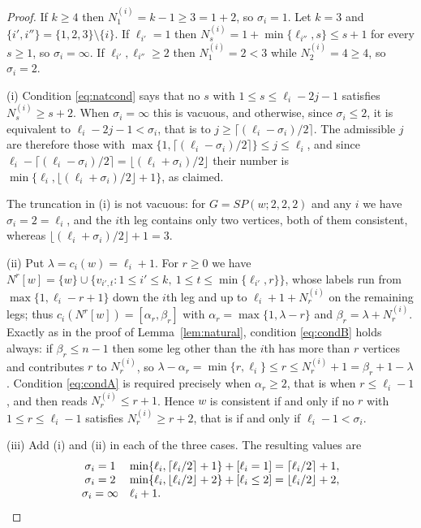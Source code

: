 \documentclass[reqno,10pt]{article}
\theoremstyle{definition}
\numberwithin{equation}{section}
\numberwithin{theorem}{section}
\newcommand{\Ball}[2]{N^{#2}[#1]}
\begin{document}
\begin{proof}
If $k\ge4$ then $N^{(i)}_1=k-1\ge3=1+2$, so $\sigma_i=1$. Let $k=3$ and
$\{i',i''\}=\{1,2,3\}\setminus\{i\}$. If $\ell_{i'}=1$ then
$N^{(i)}_s=1+\min\{\ell_{i''},s\}\le s+1$ for every $s\ge1$, so
$\sigma_i=\infty$. If $\ell_{i'},\ell_{i''}\ge2$ then $N^{(i)}_1=2<3$ while
$N^{(i)}_2=4\ge4$, so $\sigma_i=2$.

\smallskip
\noindent(i) Condition \eqref{eq:natcond} says that no $s$ with
$1\le s\le \ell_i-2j-1$ satisfies $N^{(i)}_s\ge s+2$. When $\sigma_i=\infty$
this is vacuous, and otherwise, since $\sigma_i\le2$, it is equivalent to
$\ell_i-2j-1<\sigma_i$, that is to $j\ge\lceil(\ell_i-\sigma_i)/2\rceil$. The
admissible $j$ are therefore those with
$\max\{1,\lceil(\ell_i-\sigma_i)/2\rceil\}\le j\le\ell_i$, and since
$\ell_i-\lceil(\ell_i-\sigma_i)/2\rceil=\lfloor(\ell_i+\sigma_i)/2\rfloor$ their
number is $\min\{\ell_i,\lfloor(\ell_i+\sigma_i)/2\rfloor+1\}$, as claimed.

\smallskip
\noindent The truncation in (i) is not vacuous: for $G=SP(w;2,2,2)$ and any $i$
we have $\sigma_i=2=\ell_i$, and the $i$th leg contains only two vertices, both
of them consistent, whereas $\lfloor(\ell_i+\sigma_i)/2\rfloor+1=3$.

\smallskip
\noindent(ii) Put $\lambda=c_i(w)=\ell_i+1$. For $r\ge0$ we have
$\Ball{w}{r}=\{w\}\cup\{v_{i',t}:1\le i'\le k,\ 1\le t\le\min\{\ell_{i'},r\}\}$,
whose labels run from $\max\{1,\ell_i-r+1\}$ down the $i$th leg and up to
$\ell_i+1+N^{(i)}_r$ on the remaining legs; thus
$c_i(\Ball{w}{r})=[\alpha_r,\beta_r]$ with $\alpha_r=\max\{1,\lambda-r\}$ and
$\beta_r=\lambda+N^{(i)}_r$. Exactly as in the proof of
Lemma~\ref{lem:natural}, condition \eqref{eq:condB} holds always: if
$\beta_r\le n-1$ then some leg other than the $i$th has more than $r$ vertices
and contributes $r$ to $N^{(i)}_r$, so
$\lambda-\alpha_r=\min\{r,\ell_i\}\le r\le N^{(i)}_r+1=\beta_r+1-\lambda$.
Condition \eqref{eq:condA} is required precisely when $\alpha_r\ge2$, that is
when $r\le\ell_i-1$, and then reads $N^{(i)}_r\le r+1$. Hence $w$ is consistent
if and only if no $r$ with $1\le r\le\ell_i-1$ satisfies $N^{(i)}_r\ge r+2$,
that is if and only if $\ell_i-1<\sigma_i$.

\smallskip
\noindent(iii) Add (i) and (ii) in each of the three cases. The resulting
values are
\[
\begin{array}{c@{\quad}l}
\sigma_i=1 &
  \min\{\ell_i,\lceil\ell_i/2\rceil+1\}+[\ell_i=1]
    =\lceil\ell_i/2\rceil+1,\\
\sigma_i=2 &
  \min\{\ell_i,\lfloor\ell_i/2\rfloor+2\}+[\ell_i\le2]
    =\lfloor\ell_i/2\rfloor+2,\\
\sigma_i=\infty & \ell_i+1.
\end{array}
\]
\end{proof}
\end{document}
